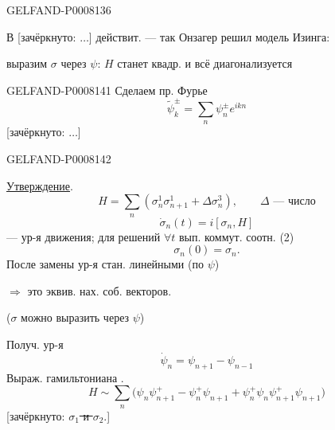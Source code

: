 \begin{GelfandAdjacentEvidence}{GELFAND-P000813}{6}


В [зачёркнуто: \(\ldots\)] действит. — так Онзагер решил модель Изинга:
\end{GelfandAdjacentEvidence}


выразим \(\sigma\) через \(\psi\): \(H\) станет квадр. и всё диагонализуется


\begin{GelfandAdjacentEvidence}{GELFAND-P000814}{1}
Сделаем пр. Фурье
\begin{equation*}
\widetilde\psi_k^\pm=\sum_n\psi_n^\pm e^{ikn}\tag{5}
\end{equation*}
[зачёркнуто: \(\ldots\)]
\end{GelfandAdjacentEvidence}
\begin{GelfandAdjacentEvidence}{GELFAND-P000814}{2}

\uline{Утверждение}.
\begin{equation*}
H=\sum_n(\sigma_n^1\sigma_{n+1}^1+\Delta\sigma_n^3),\qquad
\Delta\text{ — число}\tag{6}
\end{equation*}
\begin{equation*}
\dot\sigma_n(t)=i[\sigma_n,H]\tag{7}
\end{equation*}
— ур-я движения; для решений \(\forall t\) вып. коммут. соотн. (2)
\[
\sigma_n(0)=\sigma_n.
\]
После замены ур-я стан. линейными (по \(\psi\))

\(\Rightarrow\) это эквив. нах. соб. векторов.

(\(\sigma\) можно выразить через \(\psi\))

Получ. ур-я
\begin{equation*}
\dot\psi_n=\psi_{n+1}-\psi_{n-1}\tag{8}
\end{equation*}
Выраж. гамильтониана .
\begin{equation*}
H\sim\sum_n\bigl(\psi_n\psi_{n+1}^+-\psi_n^+\psi_{n+1}
+\psi_n^+\psi_n\psi_{n+1}^+\psi_{n+1}\bigr)\tag{9}
\end{equation*}
[зачёркнуто: \sout{\(\sigma_1\) и \(\sigma_2\)}.]
\end{GelfandAdjacentEvidence}
